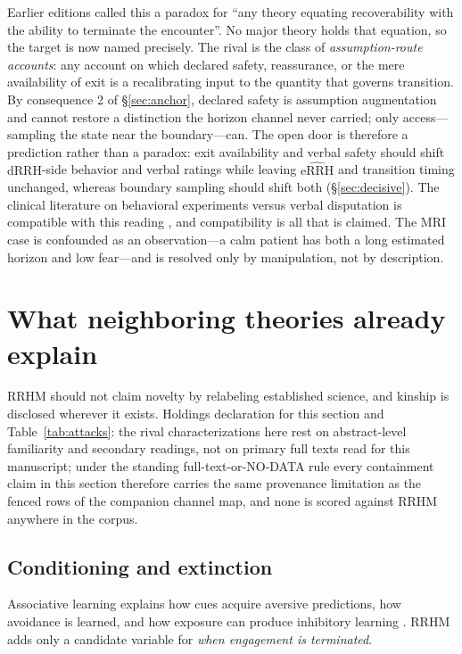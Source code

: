 \documentclass[9pt,twocolumn]{article}
\newcommand{\dRRH}{\mathrm{dRRH}}
\newcommand{\eRRHhat}{\widehat{\mathrm{eRRH}}}
\begin{document}
Earlier editions called this a paradox for ``any theory equating recoverability with the ability to terminate the encounter''. No major theory holds that equation, so the target is now named precisely. The rival is the class of \emph{assumption-route accounts}: any account on which declared safety, reassurance, or the mere availability of exit is a recalibrating input to the quantity that governs transition. By consequence 2 of \S\ref{sec:anchor}, declared safety is assumption augmentation and cannot restore a distinction the horizon channel never carried; only access---sampling the state near the boundary---can. The open door is therefore a prediction rather than a paradox: exit availability and verbal safety should shift $\dRRH$-side behavior and verbal ratings while leaving $\eRRHhat$ and transition timing unchanged, whereas boundary sampling should shift both (\S\ref{sec:decisive}). The clinical literature on behavioral experiments versus verbal disputation is compatible with this reading \cite{bennettlevy2004}, and compatibility is all that is claimed. The MRI case is confounded as an observation---a calm patient has both a long estimated horizon and low fear---and is resolved only by manipulation, not by description.

\section{What neighboring theories already explain}
RRHM should not claim novelty by relabeling established science, and kinship is disclosed wherever it exists. Holdings declaration for this section and Table~\ref{tab:attacks}: the rival characterizations here rest on abstract-level familiarity and secondary readings, not on primary full texts read for this manuscript; under the standing full-text-or-NO-DATA rule every containment claim in this section therefore carries the same provenance limitation as the fenced rows of the companion channel map, and none is scored against RRHM anywhere in the corpus.

\subsection{Conditioning and extinction}
Associative learning explains how cues acquire aversive predictions, how avoidance is learned, and how exposure can produce inhibitory learning \cite{krypotos2015,pittig2018,kausche2025,craske2014}. RRHM adds only a candidate variable for \emph{when engagement is terminated}.
\end{document}
